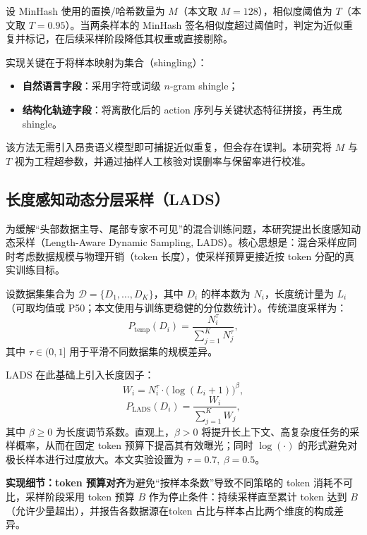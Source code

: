 \documentclass[UTF8]{article}
\begin{document}
设 MinHash 使用的置换/哈希数量为 $M$（本文取 $M=128$），相似度阈值为 $T$（本文取 $T=0.95$）。当两条样本的 MinHash 签名相似度超过阈值时，判定为近似重复并标记，在后续采样阶段降低其权重或直接剔除。

实现关键在于将样本映射为集合（shingling）：
\begin{itemize}
    \item \textbf{自然语言字段}：采用字符或词级 $n$-gram shingle；
    \item \textbf{结构化轨迹字段}：将离散化后的 action 序列与关键状态特征拼接，再生成 shingle。
\end{itemize}
该方法无需引入昂贵语义模型即可捕捉近似重复，但会存在误判。本研究将 $M$ 与 $T$ 视为工程超参数，并通过抽样人工核验对误删率与保留率进行校准。

\subsection{长度感知动态分层采样（LADS）}\label{sec:lads}

为缓解“头部数据主导、尾部专家不可见”的混合训练问题，本研究提出长度感知动态采样（Length-Aware Dynamic Sampling, LADS）。核心思想是：混合采样应同时考虑数据规模与物理开销（token 长度），使采样预算更接近按 token 分配的真实训练目标。

设数据集集合为 $\mathcal{D}=\{D_1,\dots,D_K\}$，其中 $D_i$ 的样本数为 $N_i$，长度统计量为 $L_i$（可取均值或 P50；本文使用与训练更稳健的分位数统计）。传统温度采样为：
\begin{equation}
P_{\text{temp}}(D_i)=\frac{N_i^{\tau}}{\sum_{j=1}^{K}N_j^{\tau}},
\end{equation}
其中 $\tau\in(0,1]$ 用于平滑不同数据集的规模差异。

LADS 在此基础上引入长度因子：
\begin{equation}
\label{eq:lads_weight}
W_i = N_i^{\tau}\cdot \bigl(\log(L_i+1)\bigr)^{\beta},
\end{equation}
\begin{equation}
\label{eq:lads_prob}
P_{\text{LADS}}(D_i)=\frac{W_i}{\sum_{j=1}^{K}W_j},
\end{equation}
其中 $\beta\ge 0$ 为长度调节系数。直观上，$\beta>0$ 将提升长上下文、高复杂度任务的采样概率，从而在固定 token 预算下提高其有效曝光；同时 $\log(\cdot)$ 的形式避免对极长样本进行过度放大。本文实验设置为 $\tau=0.7,\ \beta=0.5$。

\textbf{实现细节：token 预算对齐}为避免“按样本条数”导致不同策略的 token 消耗不可比，采样阶段采用 token 预算 $B$ 作为停止条件：持续采样直至累计 token 达到 $B$（允许少量超出），并报告各数据源在token 占比与样本占比两个维度的构成差异。
\end{document}
